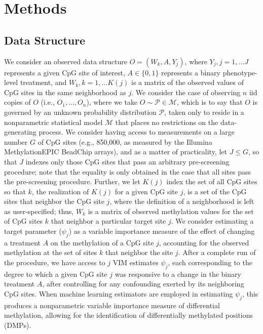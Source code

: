 \documentclass[9pt,a4paper,]{extarticle}
\theoremstyle{definition}
\theoremstyle{definition}
\theoremstyle{definition}
\theoremstyle{remark}
\begin{document}
\hypertarget{methods}{%
\section{Methods}\label{methods}}

\hypertarget{data-structure}{%
\subsection{Data Structure}\label{data-structure}}

We consider an observed data structure \(O = (W_k, A, Y_j)\), where \(Y_j, j = 1, \ldots J\) represents a given CpG site of interest, \(A \in \{0, 1\}\) represents a
binary phenotype-level treatment, and \(W_k, k = 1, \ldots K(j)\) is a matrix of
the observed values of CpG sites in the same neighborhood as \(j\). We consider
the case of observing \(n\) iid copies of \(O\) (i.e., \(O_1, \ldots, O_n\)), where we
take \(O \sim \mathcal{P} \in \mathcal{M}\), which is to say that \(O\) is governed
by an unknown probability distribution \(\mathcal{P}\), taken only to reside in a
nonparametric statistical model \(\mathcal{M}\) that places no restrictions on the
data-generating process. We consider having access to measurements on a large
number \(G\) of CpG sites (e.g., 850,000, as measured by the Illumina
MethylationEPIC BeadChip arrays), and as a matter of practicality, let \(J \leq G\), so that \(J\) indexes only those CpG sites that pass an arbitrary
pre-screening procedure; note that the equality is only obtained in the case
that all sites pass the pre-screening procedure. Further, we let \(K(j)\) index
the set of all CpG sites so that \(k\), the realization of \(K(j)\) for a given CpG
site \(j\), is a set of the CpG sites that neighbor the CpG site \(j\), where the
definition of a neighborhood is left as user-specified; thus, \(W_k\) is a matrix
of observed methylation values for the set of CpG sites \(k\) that neighbor a
particular target site \(j\). We consider estimating a target parameter (\(\psi_j\))
as a variable importance measure of the effect of changing a treatment \(A\) on
the methylation of a CpG site \(j\), accounting for the observed methylation at
the set of sites \(k\) that neighbor the site \(j\). After a complete run of the
procedure, we have access to \(j\) VIM estimates \(\psi_j\), each corresponding to
the degree to which a given CpG site \(j\) was responsive to a change in the
binary treatment \(A\), after controlling for any confounding exerted by its
neighboring CpG sites. When machine learning estimators are employed in
estimating \(\psi_j\), this produces a nonparametric variable importance measure
of differential methylation, allowing for the identification of differentially
methylated positions (DMPs).
\end{document}
